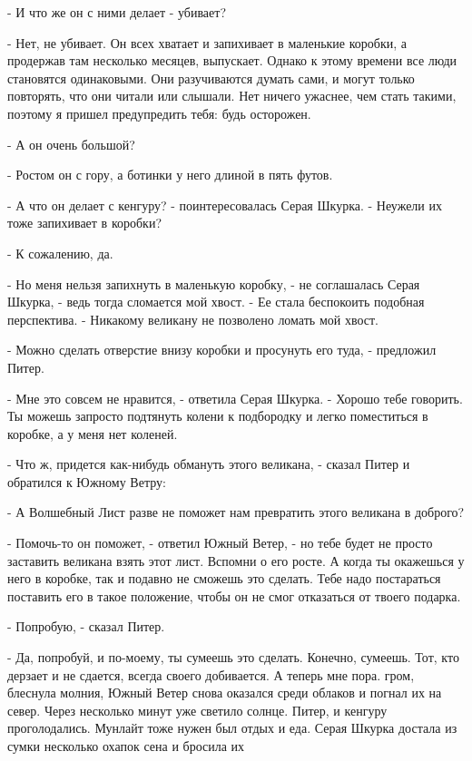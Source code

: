 \par- И что же он с ними делает - убивает?
\par- Нет, не убивает. Он всех хватает и запихивает в маленькие 
коробки, а продержав там несколько месяцев, выпускает. Однако к этому 
времени все люди становятся одинаковыми. Они разучиваются думать сами, 
и могут только повторять, что они читали или слышали. Нет ничего 
ужаснее, чем стать такими, поэтому я пришел предупредить тебя: будь 
осторожен.
\par- А он очень большой?
\par- Ростом он с гору, а ботинки у него длиной в пять футов.
\par- А что он делает с кенгуру? - поинтересовалась Серая Шкурка. - 
Неужели их тоже запихивает в коробки?
\par- К сожалению, да.
\par- Но меня нельзя запихнуть в маленькую коробку, - не соглашалась 
Серая Шкурка, - ведь тогда сломается мой хвост. - Ее стала беспокоить 
подобная перспектива. - Никакому великану не позволено ломать мой 
хвост.
\par- Можно сделать отверстие внизу коробки и просунуть его туда, - 
предложил Питер.
\par- Мне это совсем не нравится, - ответила Серая Шкурка. - Хорошо 
тебе говорить. Ты можешь запросто подтянуть колени к подбородку и 
легко поместиться в коробке, а у меня нет коленей.
\par- Что ж, придется как-нибудь обмануть этого великана, - сказал 
Питер и обратился к Южному Ветру:
\par- А Волшебный Лист разве не поможет нам превратить этого великана 
в доброго?
\par- Помочь-то он поможет, - ответил Южный Ветер, - но тебе будет не 
просто заставить великана взять этот лист. Вспомни о его росте. А 
когда ты окажешься у него в коробке, так и подавно не сможешь это 
сделать. Тебе надо постараться поставить его в такое положение, чтобы 
он не смог отказаться от твоего подарка.
\par- Попробую, - сказал Питер.
\par- Да, попробуй, и по-моему, ты сумеешь это сделать. Конечно, 
сумеешь. Тот, кто дерзает и не сдается, всегда своего добивается. А 
теперь мне пора.
 гром, блеснула молния, Южный Ветер снова оказался среди 
облаков и погнал их на север. Через несколько минут уже светило 
солнце.
 Питер, и кенгуру проголодались. Мунлайт тоже нужен был отдых и 
еда. Серая Шкурка достала из сумки несколько охапок сена и бросила их 
